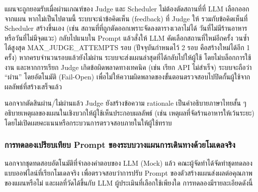 แผนจะถูกยอมรับเมื่อผ่านเกณฑ์ของ Judge และ Scheduler ไม่ต้องตัดสถานที่ที่ LLM เลือกออกจากแผน หากไม่เป็นไปตามนี้ ระบบจะนำข้อคิดเห็น (feedback) ที่ Judge ให้ รวมกับข้อคิดเห็นที่ Scheduler สร้างขึ้นเอง (เช่น สถานที่ที่ถูกตัดออกเพราะจัดลงตารางเวลาไม่ได้ วันที่ไม่มีร้านอาหาร หรือวันที่ไม่มีจุดแวะ) กลับไปแนบใน Prompt แล้วสั่งให้ LLM คัดเลือกสถานที่ใหม่อีกครั้ง วนซ้ำได้สูงสุด MAX\_JUDGE\_ATTEMPTS รอบ (ปัจจุบันกำหนดไว้ 2 รอบ คือสร้างใหม่ได้อีก 1 ครั้ง) หากครบจำนวนรอบแล้วยังไม่ผ่าน ระบบจะส่งแผนล่าสุดที่ได้กลับไปให้ผู้ใช้ โดยไม่บล็อกการใช้งาน และหากการเรียก Judge เกิดข้อผิดพลาดทางเทคนิค (เช่น เรียก API ไม่สำเร็จ) ระบบจะถือว่า ``ผ่าน'' โดยอัตโนมัติ (Fail-Open) เพื่อไม่ให้ความผิดพลาดของขั้นตอนตรวจสอบไปปิดกั้นผู้ใช้จากผลลัพธ์ที่สร้างเสร็จแล้ว

นอกจากตัดสินผ่าน/ไม่ผ่านแล้ว Judge ยังสร้างข้อความ rationale เป็นคำอธิบายภาษาไทยสั้น ๆ อธิบายเหตุผลของแผนในเชิงบวกให้ผู้ใช้เห็นประกอบผลลัพธ์ (เช่น เหตุผลที่จัดร้านอาหารให้เว้นระยะ) โดยไม่เปิดเผยคะแนนหรือกระบวนการตรวจสอบภายในให้ผู้ใช้ทราบ

\subsubsection{การทดลองเปรียบเทียบ Prompt ของระบบวางแผนการเดินทางด้วยโมเดลจริง}

นอกจากชุดทดสอบอัตโนมัติที่จำลองคำตอบของ LLM (Mock) แล้ว คณะผู้จัดทำได้จัดทำชุดทดลองแบบออฟไลน์ที่เรียกโมเดลจริง เพื่อตรวจสอบว่าการปรับ Prompt ของตัวสร้างแผนส่งผลต่อคุณภาพของแผนหรือไม่ และผลที่วัดได้ขึ้นกับ LLM ผู้ประเมินที่เลือกใช้เพียงใด การทดลองมีรายละเอียดดังนี้

